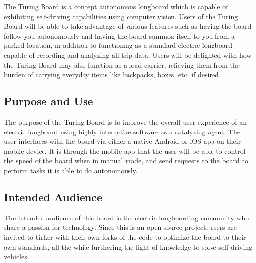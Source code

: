 The Turing Board is a concept autonomous longboard which is capable of exhibiting self-driving capabilities using computer vision. Users of the Turing Board will be able to take advantage of various features such as having the board follow you autonomously and having the board summon itself to you from a parked location, in addition to functioning as a standard electric longboard capable of recording and analyzing all trip data. Users will be delighted with how the Turing Board may also function as a load carrier, relieving them from the burden of carrying everyday items like backpacks, boxes, etc. if desired. 

\subsection{Purpose and Use}
The purpose of the Turing Board is to improve the overall user experience of an electric longboard using highly interactive software as a catalyzing agent. The user interfaces with the board via either a native Android or iOS app on their mobile device. It is through the mobile app that the user will be able to control the speed of the board when in manual mode, and send requests to the board to perform tasks it is able to do autonomously. 

\subsection{Intended Audience}
The intended audience of this board is the electric longboarding community who share a passion for technology. Since this is an open source project, users are invited to tinker with their own forks of the code to optimize the board to their own standards, all the while furthering the light of knowledge to solve self-driving vehicles. 
